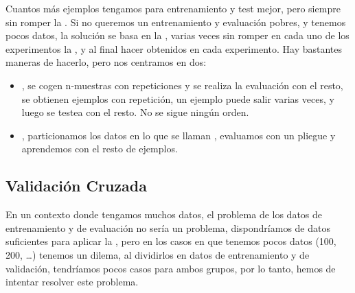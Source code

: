Cuantos más ejemplos tengamos para entrenamiento y test mejor, pero siempre sin romper la . Si no queremos un entrenamiento y evaluación pobres, y tenemos pocos datos, la solución se basa en la , varias veces sin romper en cada uno de los experimentos la , y al final hacer  obtenidos en cada experimento. Hay bastantes  maneras de hacerlo, pero nos centramos en dos:
\begin{itemize}
    \item {}, se cogen n-muestras con repeticiones y se realiza la evaluación con el resto, se obtienen ejemplos con repetición, un ejemplo puede salir varias veces, y luego se testea con el resto. No se sigue ningún orden.
    \item {}, particionamos los datos en lo que se llaman , evaluamos con un pliegue y aprendemos con el resto de ejemplos.
\end{itemize}

\subsection{Validación Cruzada}

En un contexto donde tengamos muchos datos, el problema de los datos de entrenamiento y de evaluación no sería un problema, dispondríamos de datos suficientes para aplicar la , pero en los casos en que tenemos pocos datos (100, 200, \ldots) tenemos un dilema, al dividirlos en datos de entrenamiento y de validación, tendríamos pocos casos para ambos grupos, por lo tanto, hemos de intentar resolver este problema.

